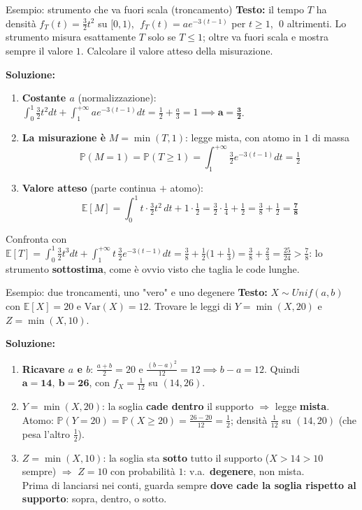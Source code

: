 \documentclass[12pt]{extarticle} %
\begin{document}
\begin{eserciziobox}{{Esempio: strumento che va fuori scala (troncamento)}}
\textbf{Testo:} il tempo $T$ ha densità $f_T(t) = \frac32 t^2$ su $[0,1)$, $\;f_T(t) = a e^{-3(t-1)}$ per $t \ge 1$, $\;0$ altrimenti. Lo strumento misura esattamente $T$ solo se $T \le 1$; oltre va fuori scala e mostra sempre il valore $1$. Calcolare il valore atteso della misurazione.
\par\textbf{Soluzione:}
\begin{enumerate}
    \item \textbf{Costante $a$} (normalizzazione): $\int_0^1 \frac32 t^2 dt + \int_1^{+\infty} a e^{-3(t-1)} dt = \frac12 + \frac{a}{3} = 1 \implies \mathbf{a = \frac32}$.
    \item \textbf{La misurazione è} $M = \min(T, 1)$: legge mista, con atomo in $1$ di massa
    $$ \mathbb{P}(M = 1) = \mathbb{P}(T \ge 1) = \int_1^{+\infty} \tfrac32 e^{-3(t-1)}dt = \tfrac12 $$
    \item \textbf{Valore atteso} (parte continua $+$ atomo):
    $$ \mathbb{E}[M] = \int_0^1 t \cdot \tfrac32 t^2\,dt + 1\cdot\tfrac12 = \tfrac32 \cdot \tfrac14 + \tfrac12 = \tfrac38 + \tfrac12 = \mathbf{\tfrac78} $$
\end{enumerate}
{\footnotesize Confronta con $\mathbb{E}[T] = \int_0^1 \frac32 t^3 dt + \int_1^{+\infty} t\,\frac32 e^{-3(t-1)}dt = \frac38 + \frac12\big(1 + \frac13\big) = \frac38 + \frac23 = \frac{25}{24} > \frac78$: lo strumento \textbf{sottostima}, come è ovvio visto che taglia le code lunghe.}
\end{eserciziobox}

\begin{eserciziobox}{{Esempio: due troncamenti, uno "vero" e uno degenere}}
\textbf{Testo:} $X \sim Unif(a,b)$ con $\mathbb{E}[X] = 20$ e $\mathrm{Var}(X) = 12$. Trovare le leggi di $Y = \min(X, 20)$ e $Z = \min(X, 10)$.
\par\textbf{Soluzione:}
\begin{enumerate}
    \item \textbf{Ricavare $a$ e $b$}: $\frac{a+b}{2} = 20$ e $\frac{(b-a)^2}{12} = 12 \implies b-a = 12$. Quindi $\mathbf{a = 14},\ \mathbf{b = 26}$, con $f_X = \frac{1}{12}$ su $(14,26)$.
    \item \textbf{$Y = \min(X,20)$}: la soglia \textbf{cade dentro} il supporto $\Rightarrow$ legge \textbf{mista}. \\
    Atomo: $\mathbb{P}(Y = 20) = \mathbb{P}(X \ge 20) = \frac{26-20}{12} = \frac12$; \; densità $\frac{1}{12}$ su $(14,20)$ (che pesa l'altro $\frac12$).
    \item \textbf{$Z = \min(X,10)$}: la soglia sta \textbf{sotto} tutto il supporto ($X > 14 > 10$ sempre) $\Rightarrow$ $Z = 10$ con probabilità $1$: v.a.\ \textbf{degenere}, non mista. \\ {\footnotesize Prima di lanciarsi nei conti, guarda sempre \textbf{dove cade la soglia rispetto al supporto}: sopra, dentro, o sotto.}
\end{enumerate}
\end{eserciziobox}
\end{document}
